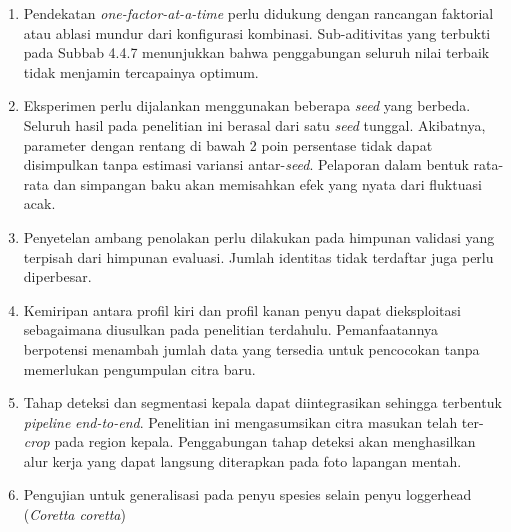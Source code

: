 \begin{enumerate}

    \item Pendekatan \textit{one-factor-at-a-time} perlu didukung dengan rancangan faktorial atau
          ablasi mundur dari konfigurasi kombinasi. Sub-aditivitas yang terbukti pada Subbab 4.4.7
          menunjukkan bahwa penggabungan seluruh nilai terbaik tidak menjamin tercapainya optimum.

    \item Eksperimen perlu dijalankan menggunakan beberapa \textit{seed} yang berbeda. Seluruh hasil
          pada penelitian ini berasal dari satu \textit{seed} tunggal. Akibatnya, parameter dengan rentang
          di bawah 2 poin persentase tidak dapat disimpulkan tanpa estimasi variansi antar-\textit{seed}.
          Pelaporan dalam bentuk rata-rata dan simpangan baku akan memisahkan efek yang nyata dari
          fluktuasi acak.

    \item Penyetelan ambang penolakan perlu dilakukan pada himpunan validasi yang
          terpisah dari himpunan evaluasi. Jumlah identitas tidak terdaftar juga perlu
          diperbesar.

    \item Kemiripan antara profil kiri dan profil kanan penyu dapat dieksploitasi sebagaimana
          diusulkan pada penelitian terdahulu. Pemanfaatannya berpotensi menambah jumlah data yang tersedia
          untuk pencocokan tanpa memerlukan pengumpulan citra baru.

    \item Tahap deteksi dan segmentasi kepala dapat diintegrasikan sehingga terbentuk
          \textit{pipeline} \textit{end-to-end}. Penelitian ini mengasumsikan citra masukan telah
          ter-\textit{crop} pada region kepala. Penggabungan tahap deteksi akan menghasilkan alur kerja yang
          dapat langsung diterapkan pada foto lapangan mentah.
      
     \item Pengujian untuk generalisasi pada penyu spesies selain penyu loggerhead (\textit{Coretta coretta})

\end{enumerate}